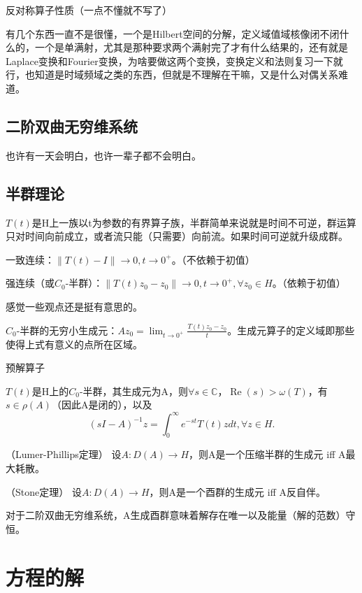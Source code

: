 反对称算子性质（一点不懂就不写了）

有几个东西一直不是很懂，一个是Hilbert空间的分解，定义域值域核像闭不闭什么的，一个是单满射，尤其是那种要求两个满射完了才有什么结果的，还有就是Laplace变换和Fourier变换，为啥要做这两个变换，变换定义和法则复习一下就行，也知道是时域频域之类的东西，但就是不理解在干嘛，又是什么对偶关系难道。

\subsection{二阶双曲无穷维系统}

也许有一天会明白，也许一辈子都不会明白。

\subsection{半群理论}

$T(t)$是H上一族以t为参数的有界算子族，半群简单来说就是时间不可逆，群运算只对时间向前成立，或者流只能（只需要）向前流。如果时间可逆就升级成群。

一致连续：$\|T(t) - I\| \to 0, t \to 0^+$。（不依赖于初值）

强连续（或$C_0$-半群）：$\left\|T(t) z_{0}-z_{0}\right\| \to 0, t \rightarrow 0^{+}, \forall z_{0} \in H$。（依赖于初值）

感觉一些观点还是挺有意思的。

$C_0$-半群的无穷小生成元：$Az_0 = \lim_{t \to 0^+} \frac{T(t)z_0 - z_0}{t}$。生成元算子的定义域即那些使得上式有意义的点所在区域。

预解算子

$T(t)$是H上的$C_{0}$-半群，其生成元为A，则$\forall s \in \mathbb{C}$，$\operatorname{Re}(s)>\omega(T)$，有$s \in \rho(A)$（因此A是闭的），以及
\[
  (sI -A)^{-1} z=\int_{0}^{\infty} e^{-s t} T(t) z d t, \forall z \in H .
\]

\begin{thm}（Lumer-Phillips定理）
  设$A: D(A) \rightarrow H$，则A是一个压缩半群的生成元 iff A最大耗散。
\end{thm}

\begin{thm}（Stone定理）
  设$A: D(A) \rightarrow H$，则A是一个酉群的生成元 iff A反自伴。
\end{thm}

对于二阶双曲无穷维系统，A生成酉群意味着解存在唯一以及能量（解的范数）守恒。

\section{方程的解}


